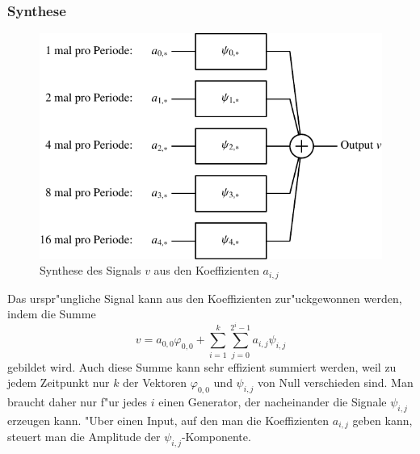 \subsubsection{Synthese}
\begin{figure}
\begin{center}
\includegraphics[width=0.8\hsize]{images/signal-3}
\end{center}
\caption{Synthese des Signals $v$ aus den Koeffizienten $a_{i,j}$
\label{waveletsynthesis}}
\end{figure}
Das urspr"ungliche Signal kann aus den Koeffizienten zur"uckgewonnen werden,
indem die Summe
$$
v=a_{0,0}\varphi_{0,0}+\sum_{i=1}^k\sum_{j=0}^{2^i-1}a_{i,j}\psi_{i,j}
$$
gebildet wird. 
Auch diese Summe kann sehr effizient summiert werden, weil zu jedem
Zeitpunkt nur $k$ der Vektoren $\varphi_{0,0}$ und $\psi_{i,j}$
von Null verschieden sind.
Man braucht daher nur f"ur jedes $i$ einen Generator, der
nacheinander die Signale $\psi_{i,j}$ erzeugen kann. "Uber
einen Input, auf den man die Koeffizienten $a_{i,j}$ geben
kann, steuert man die Amplitude der $\psi_{i,j}$-Komponente.
